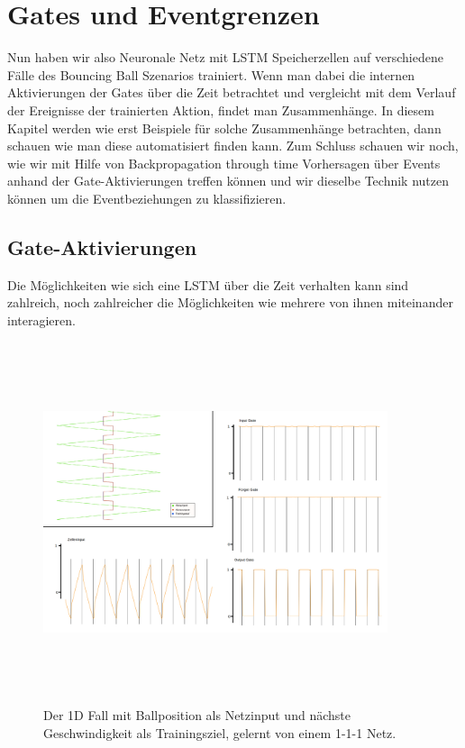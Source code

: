 \chapter{Gates und Eventgrenzen}
\label{ch:untersuchung}
Nun haben wir also Neuronale Netz mit LSTM Speicherzellen auf verschiedene Fälle des Bouncing Ball Szenarios trainiert. Wenn man dabei die internen Aktivierungen der Gates über die Zeit betrachtet und vergleicht mit dem Verlauf der Ereignisse der trainierten Aktion, findet man Zusammenhänge. In diesem Kapitel werden wie erst Beispiele für solche Zusammenhänge betrachten, dann schauen wie man diese automatisiert finden kann. Zum Schluss schauen wir noch, wie wir mit Hilfe von Backpropagation through time Vorhersagen über Events anhand der Gate-Aktivierungen treffen können und wir dieselbe Technik nutzen können um die Eventbeziehungen zu klassifizieren.
\section{Gate-Aktivierungen}
Die Möglichkeiten wie sich eine LSTM über die Zeit verhalten kann sind zahlreich, noch zahlreicher die Möglichkeiten wie mehrere von ihnen miteinander interagieren. 


\begin{figure}
	\centering
	\includegraphics[width=0.9\textwidth, height=400px]{pics/act1.png}	
	\caption{Der 1D Fall mit Ballposition als Netzinput und nächste Geschwindigkeit als Trainingsziel, gelernt von einem 1-1-1 Netz.  }
	\label{img:act1}
\end{figure}


